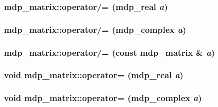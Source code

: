 \label{classmdp__matrix_aaceb320e98a01a83350685591657861f}
\hypertarget{classmdp__matrix_abc83a95f12ed5f697213cf9d812a99cd}{
\subsubsection[{operator/=}]{ mdp\_\-matrix::operator/= ({\bf mdp\_\-real} {\em a})}}
\label{classmdp__matrix_abc83a95f12ed5f697213cf9d812a99cd}
\hypertarget{classmdp__matrix_aab26bb8bce6bb9f9207e2776297c1f8d}{
\subsubsection[{operator/=}]{ mdp\_\-matrix::operator/= ({\bf mdp\_\-complex} {\em a})}}
\label{classmdp__matrix_aab26bb8bce6bb9f9207e2776297c1f8d}
\hypertarget{classmdp__matrix_a0c1945c09ca3bea26e1096253b49a25d}{
\subsubsection[{operator/=}]{ mdp\_\-matrix::operator/= (const {\bf mdp\_\-matrix} \& {\em a})}}
\label{classmdp__matrix_a0c1945c09ca3bea26e1096253b49a25d}
\hypertarget{classmdp__matrix_a87d932535b5e5b0f28943a76a867d983}{
\subsubsection[{operator=}]{\setlength{\rightskip}{0pt plus 5cm}void mdp\_\-matrix::operator= ({\bf mdp\_\-real} {\em a})}}
\label{classmdp__matrix_a87d932535b5e5b0f28943a76a867d983}
\hypertarget{classmdp__matrix_a3d8e6aca507fe6daada3b337ba2e027e}{
\subsubsection[{operator=}]{\setlength{\rightskip}{0pt plus 5cm}void mdp\_\-matrix::operator= ({\bf mdp\_\-complex} {\em a})}}
